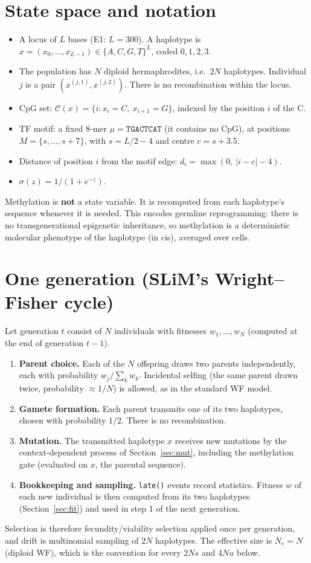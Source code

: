 \documentclass[11pt]{article}
\theoremstyle{definition}
\newcommand{\sig}{\sigma}
\begin{document}
\section{State space and notation}
\begin{itemize}
\item A locus of $L$ bases (E1: $L=300$). A haplotype is $x=(x_0,\dots,x_{L-1})\in\{A,C,G,T\}^L$, coded $0,1,2,3$.
\item The population has $N$ diploid hermaphrodites, i.e.\ $2N$ haplotypes. Individual $j$ is a pair
  $(x^{(j,1)},x^{(j,2)})$. There is no recombination within the locus.
\item CpG set: $\mathcal{C}(x)=\{i: x_i=C,\ x_{i+1}=G\}$, indexed by the position $i$ of the C.
\item TF motif: a fixed 8-mer $\mu=\texttt{TGACTCAT}$ (it contains no CpG), at positions $M=\{s,\dots,s+7\}$, with
  $s=L/2-4$ and centre $c=s+3.5$.
\item Distance of position $i$ from the motif edge: $d_i=\max(0,\ |i-c|-4)$.
\item $\sig(z)=1/(1+e^{-z})$.
\end{itemize}
Methylation is \textbf{not} a state variable. It is recomputed from each haplotype's sequence whenever it is needed.
This encodes germline reprogramming: there is no transgenerational epigenetic inheritance, so methylation is a
deterministic molecular phenotype of the haplotype (in cis), averaged over cells.

\section{One generation (SLiM's Wright--Fisher cycle)}\label{sec:cycle}
Let generation $t$ consist of $N$ individuals with fitnesses $w_1,\dots,w_N$ (computed at the end of generation $t-1$).
\begin{enumerate}
\item \textbf{Parent choice.} Each of the $N$ offspring draws two parents independently, each with probability
  $w_j/\sum_k w_k$. Incidental selfing (the same parent drawn twice, probability $\approx 1/N$) is allowed, as in the
  standard WF model.
\item \textbf{Gamete formation.} Each parent transmits one of its two haplotypes, chosen with probability $1/2$.
  There is no recombination.
\item \textbf{Mutation.} The transmitted haplotype $x$ receives new mutations by the context-dependent process of
  Section~\ref{sec:mut}, including the methylation gate (evaluated on $x$, the parental sequence).
\item \textbf{Bookkeeping and sampling.} \texttt{late()} events record statistics. Fitness $w$ of each new individual
  is then computed from its two haplotypes (Section~\ref{sec:fit}) and used in step 1 of the next generation.
\end{enumerate}
Selection is therefore fecundity/viability selection applied once per generation, and drift is multinomial sampling of
$2N$ haplotypes. The effective size is $N_e=N$ (diploid WF), which is the convention for every $2N s$ and $4N u$ below.
\end{document}
